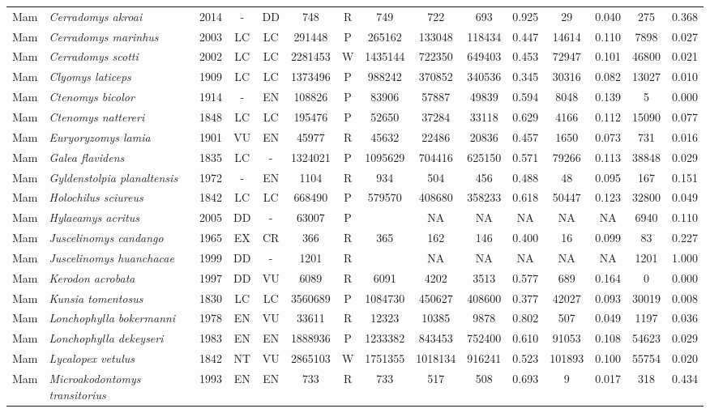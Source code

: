 \documentclass[12pt,openright,oneside,a4paper,english]{abntex2}
\begin{document}
\begin{landscape}
\begin{longtable}{llccccccccccccc}
		Mam&\textit{Cerradomys akroai}&2014&-&DD&748&R&749&722&693&0.925&29&0.040&275&0.368\\
		Mam&\textit{Cerradomys marinhus}&2003&LC&LC&291448&P&265162&133048&118434&0.447&14614&0.110&7898&0.027\\
		Mam&\textit{Cerradomys scotti}&2002&LC&LC&2281453&W&1435144&722350&649403&0.453&72947&0.101&46800&0.021\\
		Mam&\textit{Clyomys laticeps}&1909&LC&LC&1373496&P&988242&370852&340536&0.345&30316&0.082&13027&0.010\\
		Mam&\textit{Ctenomys bicolor}&1914&-&EN&108826&P&83906&57887&49839&0.594&8048&0.139&5&0.000\\
		Mam&\textit{Ctenomys nattereri}&1848&LC&LC&195476&P&52650&37284&33118&0.629&4166&0.112&15090&0.077\\
		Mam&\textit{Euryoryzomys lamia}&1901&VU&EN&45977&R&45632&22486&20836&0.457&1650&0.073&731&0.016\\
		Mam&\textit{Galea flavidens}&1835&LC&-&1324021&P&1095629&704416&625150&0.571&79266&0.113&38848&0.029\\
		Mam&\textit{Gyldenstolpia planaltensis}&1972&-&EN&1104&R&934&504&456&0.488&48&0.095&167&0.151\\
		Mam&\textit{Holochilus sciureus}&1842&LC&LC&668490&P&579570&408680&358233&0.618&50447&0.123&32800&0.049\\
		Mam&\textit{Hylaeamys acritus}&2005&DD&-&63007&P&&NA&NA&NA&NA&NA&6940&0.110\\
		Mam&\textit{Juscelinomys candango}&1965&EX&CR&366&R&365&162&146&0.400&16&0.099&83&0.227\\
		Mam&\textit{Juscelinomys huanchacae}&1999&DD&-&1201&R&&NA&NA&NA&NA&NA&1201&1.000\\
		Mam&\textit{Kerodon acrobata}&1997&DD&VU&6089&R&6091&4202&3513&0.577&689&0.164&0&0.000\\
		Mam&\textit{Kunsia tomentosus}&1830&LC&LC&3560689&P&1084730&450627&408600&0.377&42027&0.093&30019&0.008\\
		Mam&\textit{Lonchophylla bokermanni}&1978&EN&VU&33611&R&12323&10385&9878&0.802&507&0.049&1197&0.036\\
		Mam&\textit{Lonchophylla dekeyseri}&1983&EN&EN&1888936&P&1233382&843453&752400&0.610&91053&0.108&54623&0.029\\
		Mam&\textit{Lycalopex vetulus}&1842&NT&VU&2865103&W&1751355&1018134&916241&0.523&101893&0.100&55754&0.020\\
		Mam&\textit{Microakodontomys transitorius}&1993&EN&EN&733&R&733&517&508&0.693&9&0.017&318&0.434\\

\end{longtable}
\end{landscape}
\end{document}
